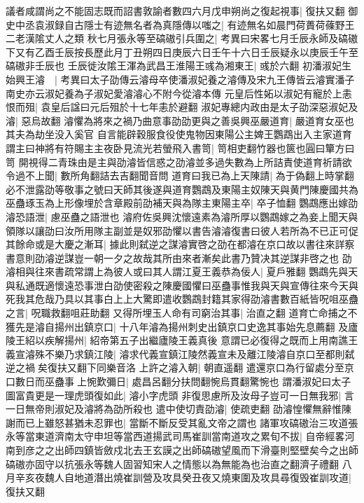 議者咸謂尚之不能固志既而詔書敦諭者數四六月戊申朔尚之復起視事|{
	復扶又翻}
御史中丞袁淑録自古隱士有迹無名者為真隱傳以嗤之|{
	有迹無名如晨門荷蕢荷蓧野王二老漢隂丈人之類}
秋七月張永等至碻磝引兵圍之|{
	考異曰宋畧七月壬辰永師及碻磝下又有乙酉壬辰按長歷此月丁丑朔四日庚辰六日壬午十六日壬辰疑永以庚辰壬午至碻磝非壬辰也}
壬辰徙汝隂王渾為武昌王淮陽王彧為湘東王|{
	彧於六翻}
初潘淑妃生始興王濬　|{
	考異曰太子劭傳云濬母卒使潘淑妃養之濬傳及宋九王傳皆云濬實潘子南史亦云淑妃養為子淑妃愛濬濬心不附今從濬本傳}
元皇后性妬以淑妃有寵於上恚恨而殂|{
	袁皇后諡曰元后殂於十七年恚於避翻}
淑妃專總内政由是太子劭深惡淑妃及濬|{
	惡烏故翻}
濬懼為將來之禍乃曲意事劭劭更與之善吳興巫嚴道育|{
	嚴道育女巫也其夫為劫坐没入奚官}
自言能辟穀服食役使鬼物因東陽公主婢王鸚鵡出入主家道育謂主曰神將有符賜主主夜卧見流光若螢飛入書笥|{
	笥相吏翻竹器也篋也圓曰簞方曰笥}
開視得二青珠由是主與劭濬皆信惑之劭濬並多過失數為上所詰責使道育祈請欲令過不上聞|{
	數所角翻詰去吉翻聞音問}
道育曰我已為上天陳請|{
	為于偽翻上時掌翻}
必不泄露劭等敬事之號曰天師其後遂與道育鸚鵡及東陽主奴陳天與黄門陳慶國共為巫蠱琢玉為上形像埋於含章殿前劭補天與為隊主東陽主卒|{
	卒子恤翻}
鸚鵡應出嫁劭濬恐語泄|{
	慮巫蠱之語泄也}
濬府佐吳興沈懷遠素為濬所厚以鸚鵡嫁之為妾上聞天與領隊以讓劭曰汝所用隊主副並是奴邪劭懼以書告濬濬復書曰彼人若所為不已正可促其餘命或是大慶之漸耳|{
	據此則弑逆之謀濬實啓之劭在都濬在京口故以書往來詳察書意則劭濬逆謀豈一朝一夕之故哉其所由來者漸矣此書乃贊决其逆謀非啓之也}
劭濬相與往來書疏常謂上為彼人或曰其人謂江夏王義恭為佞人|{
	夏戶雅翻}
鸚鵡先與天與私通既適懷遠恐事泄白劭使密殺之陳慶國懼曰巫蠱事惟我與天與宣傳往來今天與死我其危哉乃具以其事白上上大驚即遣收鸚鵡封籍其家得劭濬書數百紙皆呪咀巫蠱之言|{
	呪職救翻咀莊助翻}
又得所埋玉人命有司窮治其事|{
	治直之翻}
道育亡命捕之不獲先是濬自揚州出鎮京口|{
	十八年濬為揚州刺史出鎮京口史逸其事始先息薦翻}
及廬陵王紹以疾解揚州|{
	紹帝第五子出繼廬陵王義真後}
意謂已必復得之既而上用南譙王義宣濬殊不樂乃求鎮江陵|{
	濬求代義宣鎮江陵然義宣未及離江陵濬自京口至都則弑逆之禍矣復扶又翻下同樂音洛}
上許之濬入朝|{
	朝直遥翻}
遣還京口為行留處分至京口數日而巫蠱事上惋歎彌日|{
	處昌呂翻分扶問翻惋烏貫翻驚惋也}
謂潘淑妃曰太子圖富貴更是一理虎頭復如此|{
	濬小字虎頭}
非復思慮所及汝母子豈可一日無我邪|{
	言一日無帝則淑妃及濬將為劭所殺也}
遣中使切責劭濬|{
	使疏吏翻}
劭濬惶懼無辭惟陳謝而已上雖怒甚猶未忍罪也|{
	當斷不斷反受其亂文帝之謂也}
諸軍攻碻磝治三攻道張永等當東道濟南太守申坦等當西道揚武司馬崔訓當南道攻之累旬不拔|{
	自帝經畧河南到彦之之出師四鎮皆斂戍北去王玄謨之出師碻磝望風而下滑臺則堅壁矣今之出師碻磝亦固守以抗張永等魏人固習知宋人之情態以為無能為也治直之翻濟子禮翻}
八月辛亥夜魏人自地道潛出燒崔訓營及攻具癸丑夜又燒東圍及攻具尋復毁崔訓攻道|{
	復扶又翻}

